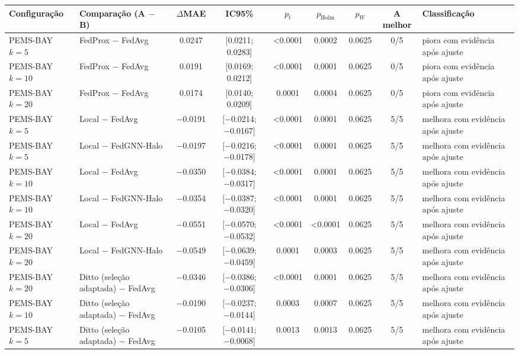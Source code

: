 
\begin{tabular}{>{\raggedright\arraybackslash}l>{\raggedright\arraybackslash}p{3.3cm}cccccc>{\raggedright\arraybackslash}p{3.3cm}}
\toprule
Configuração & Comparação (A $-$ B) & $\Delta$MAE & IC95\% & $p_t$ & $p_{\mathrm{Holm}}$ & $p_W$ & A melhor & Classificação \\
\midrule
PEMS-BAY $k=5$ & FedProx − FedAvg & \num{+0.0247} & [\num{+0.0211}; \num{+0.0283}] & \num{<0.0001} & \num{0.0002} & \num{0.0625} & 0/5 & piora com evidência após ajuste \\
PEMS-BAY $k=10$ & FedProx − FedAvg & \num{+0.0191} & [\num{+0.0169}; \num{+0.0212}] & \num{<0.0001} & \num{0.0001} & \num{0.0625} & 0/5 & piora com evidência após ajuste \\
PEMS-BAY $k=20$ & FedProx − FedAvg & \num{+0.0174} & [\num{+0.0140}; \num{+0.0209}] & \num{0.0001} & \num{0.0004} & \num{0.0625} & 0/5 & piora com evidência após ajuste \\
PEMS-BAY $k=5$ & Local − FedAvg & \num{-0.0191} & [\num{-0.0214}; \num{-0.0167}] & \num{<0.0001} & \num{0.0001} & \num{0.0625} & 5/5 & melhora com evidência após ajuste \\
PEMS-BAY $k=5$ & Local − FedGNN-Halo & \num{-0.0197} & [\num{-0.0216}; \num{-0.0178}] & \num{<0.0001} & \num{0.0001} & \num{0.0625} & 5/5 & melhora com evidência após ajuste \\
PEMS-BAY $k=10$ & Local − FedAvg & \num{-0.0350} & [\num{-0.0384}; \num{-0.0317}] & \num{<0.0001} & \num{0.0001} & \num{0.0625} & 5/5 & melhora com evidência após ajuste \\
PEMS-BAY $k=10$ & Local − FedGNN-Halo & \num{-0.0354} & [\num{-0.0387}; \num{-0.0320}] & \num{<0.0001} & \num{0.0001} & \num{0.0625} & 5/5 & melhora com evidência após ajuste \\
PEMS-BAY $k=20$ & Local − FedAvg & \num{-0.0551} & [\num{-0.0570}; \num{-0.0532}] & \num{<0.0001} & \num{<0.0001} & \num{0.0625} & 5/5 & melhora com evidência após ajuste \\
PEMS-BAY $k=20$ & Local − FedGNN-Halo & \num{-0.0549} & [\num{-0.0639}; \num{-0.0459}] & \num{0.0001} & \num{0.0003} & \num{0.0625} & 5/5 & melhora com evidência após ajuste \\
PEMS-BAY $k=20$ & Ditto (seleção adaptada) − FedAvg & \num{-0.0346} & [\num{-0.0386}; \num{-0.0306}] & \num{<0.0001} & \num{0.0001} & \num{0.0625} & 5/5 & melhora com evidência após ajuste \\
PEMS-BAY $k=10$ & Ditto (seleção adaptada) − FedAvg & \num{-0.0190} & [\num{-0.0237}; \num{-0.0144}] & \num{0.0003} & \num{0.0007} & \num{0.0625} & 5/5 & melhora com evidência após ajuste \\
PEMS-BAY $k=5$ & Ditto (seleção adaptada) − FedAvg & \num{-0.0105} & [\num{-0.0141}; \num{-0.0068}] & \num{0.0013} & \num{0.0013} & \num{0.0625} & 5/5 & melhora com evidência após ajuste \\
\bottomrule
\end{tabular}
